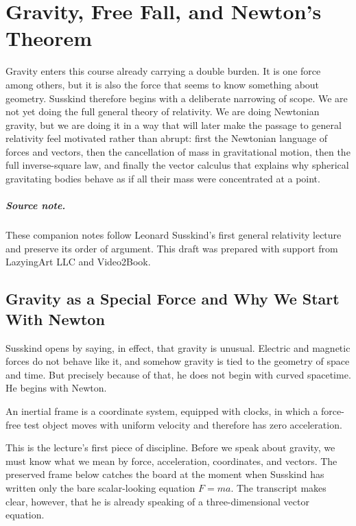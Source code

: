 \chapter{Gravity, Free Fall, and Newton's Theorem}

Gravity enters this course already carrying a double burden. It is one force among others, but it is also the force that seems to know something about geometry. Susskind therefore begins with a deliberate narrowing of scope. We are not yet doing the full general theory of relativity. We are doing Newtonian gravity, but we are doing it in a way that will later make the passage to general relativity feel motivated rather than abrupt: first the Newtonian language of forces and vectors, then the cancellation of mass in gravitational motion, then the full inverse-square law, and finally the vector calculus that explains why spherical gravitating bodies behave as if all their mass were concentrated at a point.

\paragraph{Source note.} These companion notes follow Leonard Susskind's first general relativity lecture and preserve its order of argument. This draft was prepared with support from LazyingArt LLC and Video2Book.

\section{Gravity as a Special Force and Why We Start With Newton}

Susskind opens by saying, in effect, that gravity is unusual. Electric and magnetic forces do not behave like it, and somehow gravity is tied to the geometry of space and time. But precisely because of that, he does not begin with curved spacetime. He begins with Newton.

\begin{definition}
An inertial frame is a coordinate system, equipped with clocks, in which a force-free test object moves with uniform velocity and therefore has zero acceleration.
\end{definition}

This is the lecture's first piece of discipline. Before we speak about gravity, we must know what we mean by force, acceleration, coordinates, and vectors. The preserved frame below catches the board at the moment when Susskind has written only the bare scalar-looking equation \(F=ma\). The transcript makes clear, however, that he is already speaking of a three-dimensional vector equation.

